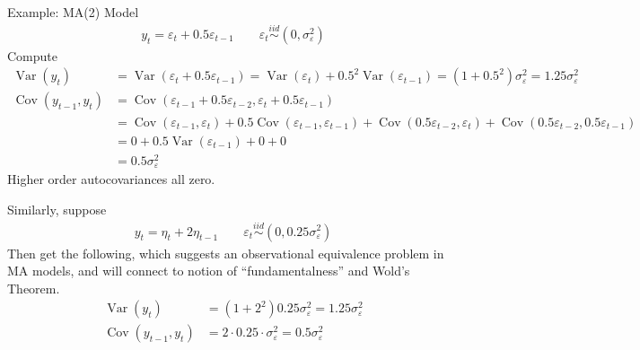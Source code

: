 \documentclass[aspectratio=169, handout]{beamer}
\newcommand{\iid}{\overset{iid}{\sim}}
\newcommand{\Cov}{\operatorname{Cov}}
\newcommand{\Var}{\operatorname{Var}}
\begin{document}
{\scriptsize
\begin{frame}{Example: MA(2)}
Model
\begin{align*}
  y_t = \varepsilon_t + 0.5 \varepsilon_{t-1}
  \qquad
  \varepsilon_t\iid(0,\sigma^2_\varepsilon)
\end{align*}
Compute
\begin{align*}
  \Var(y_t)
  &= \Var(\varepsilon_t + 0.5 \varepsilon_{t-1})
  = \Var(\varepsilon_t) + 0.5^2 \Var(\varepsilon_{t-1})
  = (1+0.5^2) \sigma^2_\varepsilon
  = 1.25 \sigma^2_\varepsilon
  \\
  \Cov(y_{t-1},y_{t})
  &=
  \Cov(\varepsilon_{t-1} + 0.5 \varepsilon_{t-2}, \varepsilon_t + 0.5 \varepsilon_{t-1})
  \\
  &=
  \Cov(\varepsilon_{t-1}, \varepsilon_t)
  + 0.5 \Cov(\varepsilon_{t-1}, \varepsilon_{t-1})
  + \Cov(0.5 \varepsilon_{t-2}, \varepsilon_t)
  + \Cov(0.5 \varepsilon_{t-2}, 0.5\varepsilon_{t-1})
  \\
  &=
  0
  + 0.5 \Var(\varepsilon_{t-1})
  + 0
  + 0
  \\
  &=
  0.5 \sigma^2_\varepsilon
\end{align*}
Higher order autocovariances all zero.

Similarly, suppose
\begin{align*}
  y_t = \eta_t + 2\eta_{t-1}
  \qquad
  \varepsilon_t\iid(0,0.25\sigma^2_\varepsilon)
\end{align*}
Then get the following, which suggests an observational
equivalence problem in MA models, and will connect to notion of
``fundamentalness'' and Wold's Theorem.
\begin{align*}
  \Var(y_t)
  &= (1+2^2) 0.25\sigma^2_\varepsilon
  = 1.25\sigma^2_\varepsilon
  \\
  \Cov(y_{t-1},y_{t})
  &=
  2 \cdot 0.25 \cdot \sigma^2_\varepsilon
  = 0.5 \sigma^2_\varepsilon
\end{align*}
\end{frame}
}
\end{document}
